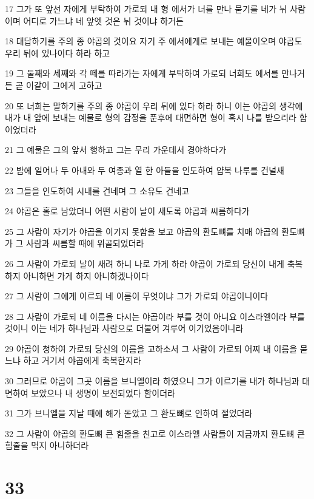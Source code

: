 \par 17 그가 또 앞선 자에게 부탁하여 가로되 내 형 에서가 너를 만나 묻기를 네가 뉘 사람이며 어디로 가느냐 네 앞엣 것은 뉘 것이냐 하거든
\par 18 대답하기를 주의 종 야곱의 것이요 자기 주 에서에게로 보내는 예물이오며 야곱도 우리 뒤에 있나이다 하라 하고
\par 19 그 둘째와 세째와 각 떼를 따라가는 자에게 부탁하여 가로되 너희도 에서를 만나거든 곧 이같이 그에게 고하고
\par 20 또 너희는 말하기를 주의 종 야곱이 우리 뒤에 있다 하라 하니 이는 야곱의 생각에 내가 내 앞에 보내는 예물로 형의 감정을 푼후에 대면하면 형이 혹시 나를 받으리라 함이었더라
\par 21 그 예물은 그의 앞서 행하고 그는 무리 가운데서 경야하다가
\par 22 밤에 일어나 두 아내와 두 여종과 열 한 아들을 인도하여 얍복 나루를 건널새
\par 23 그들을 인도하여 시내를 건네며 그 소유도 건네고
\par 24 야곱은 홀로 남았더니 어떤 사람이 날이 새도록 야곱과 씨름하다가
\par 25 그 사람이 자기가 야곱을 이기지 못함을 보고 야곱의 환도뼈를 치매 야곱의 환도뼈가 그 사람과 씨름할 때에 위골되었더라
\par 26 그 사람이 가로되 날이 새려 하니 나로 가게 하라 야곱이 가로되 당신이 내게 축복하지 아니하면 가게 하지 아니하겠나이다
\par 27 그 사람이 그에게 이르되 네 이름이 무엇이냐 그가 가로되 야곱이니이다
\par 28 그 사람이 가로되 네 이름을 다시는 야곱이라 부를 것이 아니요 이스라엘이라 부를 것이니 이는 네가 하나님과 사람으로 더불어 겨루어 이기었음이니라
\par 29 야곱이 청하여 가로되 당신의 이름을 고하소서 그 사람이 가로되 어찌 내 이름을 묻느냐 하고 거기서 야곱에게 축복한지라
\par 30 그러므로 야곱이 그곳 이름을 브니엘이라 하였으니 그가 이르기를 내가 하나님과 대면하여 보았으나 내 생명이 보전되었다 함이더라
\par 31 그가 브니엘을 지날 때에 해가 돋았고 그 환도뼈로 인하여 절었더라
\par 32 그 사람이 야곱의 환도뼈 큰 힘줄을 친고로 이스라엘 사람들이 지금까지 환도뼈 큰 힘줄을 먹지 아니하더라

\chapter{33}

